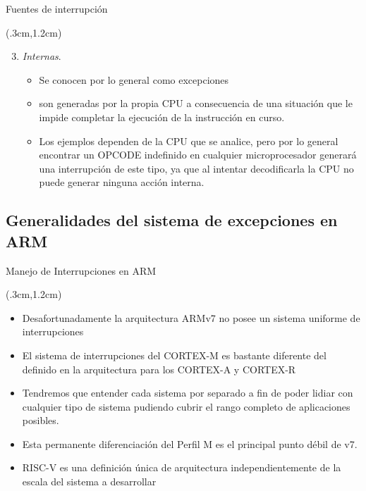 \documentclass[table,x11names,aspectratio=169]{beamer}
\begin{document}
\begin{frame}{Fuentes de interrupción}
 \begin{textblock*}{\textwidth}(.3cm,1.2cm) 
  \begin{enumerate} \setcounter{enumi}{2}    
   \item \emph{\color{blue}Internas}.
   \begin{itemize} \justifying
    \item Se conocen por lo general como excepciones
    \item son generadas por la propia CPU a consecuencia de una situación que le impide completar la ejecución de la instrucción en curso. 
    \item Los ejemplos dependen de la CPU que se analice, pero por lo general encontrar un OPCODE indefinido en cualquier microprocesador generará una interrupción de este tipo, ya que al intentar decodificarla la CPU no puede generar ninguna acción interna.
   \end{itemize}
  \end{enumerate}
\end{textblock*}
\end{frame}

\subsection{Generalidades del sistema de excepciones en ARM}
\begin{frame}{Manejo de Interrupciones en ARM}
 \begin{textblock*}{\textwidth}(.3cm,1.2cm) 
  \begin{itemize}[<+(1)->] \justifying \parskip 0.4cm
   \item Desafortunadamente la arquitectura ARMv7 no posee un sistema uniforme de interrupciones
   \item El sistema de interrupciones del CORTEX-M es bastante diferente del definido en la arquitectura para los CORTEX-A y CORTEX-R
   \item Tendremos que entender cada sistema por separado a fin de poder lidiar con cualquier tipo de sistema pudiendo cubrir el rango completo de aplicaciones posibles.
   \item Esta permanente diferenciación del Perfil M es el principal punto débil de v7.
   \item RISC-V es una definición única de arquitectura independientemente de la escala del sistema a desarrollar
  \end{itemize}
 \end{textblock*}
\end{frame}
\end{document}
